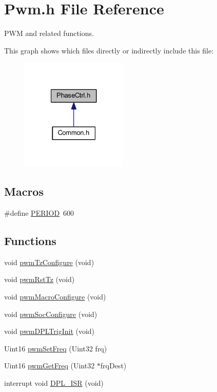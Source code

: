 \hypertarget{a00025}{\section{Pwm.\-h File Reference}
\label{a00025}
}


P\-W\-M and related functions.  


This graph shows which files directly or indirectly include this file\-:
\nopagebreak
\begin{figure}[H]
\begin{center}
\leavevmode
\includegraphics[width=144pt]{a00051}
\end{center}
\end{figure}
\subsection*{Macros}
\begin{DoxyCompactItemize}
\item 
\#define \hyperlink{a00025_af281425e62298bac2df0fbe8690a4844}{P\-E\-R\-I\-O\-D}~600
\end{DoxyCompactItemize}
\subsection*{Functions}
\begin{DoxyCompactItemize}
\item 
void \hyperlink{a00025_aced17503c602f9e71a2d101e956cce23}{pwm\-Tz\-Configure} (void)
\item 
void \hyperlink{a00025_a94a47896496e094f8ab54c1cb46da2e1}{pwm\-Rst\-Tz} (void)
\item 
void \hyperlink{a00025_acc68120fcdfa36145370c31a61eb23a7}{pwm\-Macro\-Configure} (void)
\item 
void \hyperlink{a00025_a358d8706acd0faf4e1cc705129be6548}{pwm\-Soc\-Configure} (void)
\item 
void \hyperlink{a00025_adfbaf2bb56a0c9fe6f54826499cb57de}{pwm\-D\-P\-L\-Trig\-Init} (void)
\item 
Uint16 \hyperlink{a00025_af82e2c1ff72afc3de42eb172ca925956}{pwm\-Set\-Freq} (Uint32 frq)
\item 
Uint16 \hyperlink{a00025_a79f203a5167440096f2ba270813b6db2}{pwm\-Get\-Freq} (Uint32 $\ast$frq\-Dest)
\item 
interrupt void \hyperlink{a00025_a5532a53363218854b0e4b15049d773f7}{D\-P\-L\-\_\-\-I\-S\-R} (void)
\end{DoxyCompactItemize}
